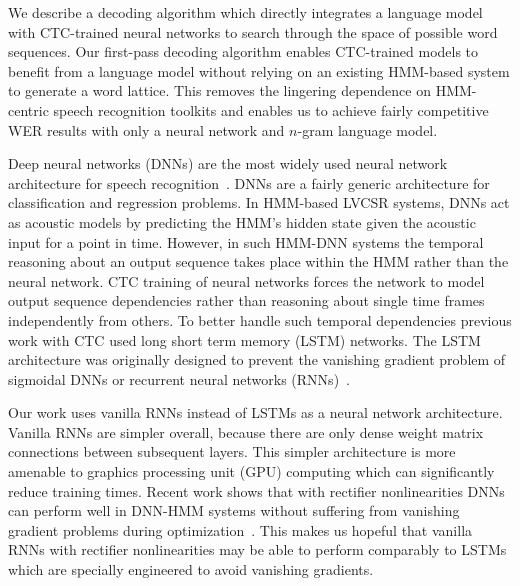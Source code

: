 We describe a decoding algorithm which directly integrates a language model
with CTC-trained neural networks to search through the space of possible word
sequences. Our first-pass decoding algorithm enables CTC-trained models to
benefit from a language model without relying on an existing HMM-based system
to generate a word lattice. This removes the lingering dependence on
HMM-centric speech recognition toolkits and enables us to achieve fairly
competitive WER results with only a neural network and $n$-gram language model.

Deep neural networks (DNNs) are the most widely used neural network
architecture for speech recognition~\cite{hinton2012}. DNNs are a fairly
generic architecture for classification and regression problems. In HMM-based
LVCSR systems, DNNs act as acoustic models by predicting the HMM's hidden state
given the acoustic input for a point in time. However, in such HMM-DNN systems
the temporal reasoning about an output sequence takes place within the HMM
rather than the neural network. CTC training of neural networks forces the
network to model output sequence dependencies rather than reasoning about
single time frames independently from others. To better handle such temporal
dependencies previous work with CTC used long short term memory (LSTM)
networks. The LSTM architecture was originally designed to prevent the
vanishing gradient problem of sigmoidal DNNs or recurrent neural networks
(RNNs)~\cite{hochreiter1997}.

Our work uses vanilla RNNs instead of LSTMs as a neural network architecture.
Vanilla RNNs are simpler overall, because there are only dense weight matrix
connections between subsequent layers. This simpler architecture is more
amenable to graphics processing unit (GPU) computing which can significantly
reduce training times. Recent work shows that with rectifier nonlinearities
DNNs can perform well in DNN-HMM systems without suffering from vanishing
gradient problems during optimization~\cite{dahl2013, zeiler2013, maas2013}.
This makes us hopeful that vanilla RNNs with rectifier nonlinearities may be
able to perform comparably to LSTMs which are specially engineered to avoid
vanishing gradients.
